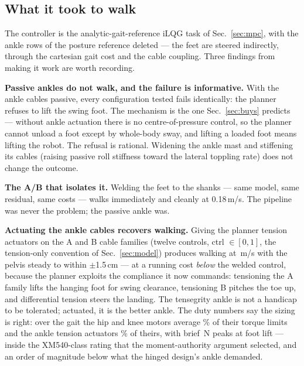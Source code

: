 \documentclass[conference]{IEEEtran}
\begin{document}
\subsection{What it took to walk}
The controller is the analytic-gait-reference iLQG task of
Sec.~\ref{sec:mpc}, with the ankle rows of the posture reference deleted ---
the feet are steered indirectly, through the cartesian gait cost and the
cable coupling. Three findings from making it work are worth recording.

\textbf{Passive ankles do not walk, and the failure is informative.} With the
ankle cables passive, every configuration tested fails identically: the
planner refuses to lift the swing foot. The mechanism is the one
Sec.~\ref{sec:buys} predicts --- without ankle actuation there is no
centre-of-pressure control, so the planner cannot unload a foot except by
whole-body sway, and lifting a loaded foot means lifting the robot. The
refusal is rational. Widening the ankle mast and stiffening its cables
(raising passive roll stiffness toward the lateral toppling rate) does not
change the outcome.

\textbf{The A/B that isolates it.} Welding the feet to the shanks --- same
model, same residual, same costs --- walks immediately and cleanly at
0.18\,m/s. The pipeline was never the problem; the passive ankle was.

\textbf{Actuating the ankle cables recovers walking.} Giving the planner
tension actuators on the A and B cable families (twelve controls, ctrl
$\in[0,1]$, the tension-only convention of Sec.~\ref{sec:model}) produces
walking at \hybridSpeed\,m/s with the pelvis steady to within $\pm$1.5\,cm
--- at a running cost \emph{below} the welded control, because the planner
exploits the compliance it now commands: tensioning the A family lifts the
hanging foot for swing clearance, tensioning B pitches the toe up, and
differential tension steers the landing. The tensegrity ankle is not a
handicap to be tolerated; actuated, it is the better ankle. The duty numbers
say the sizing is right: over the gait the hip and knee motors average
\hybridJointDuty\% of their torque limits and the ankle tension actuators
\hybridAnkleDuty\% of theirs, with brief \hybridAnklePeak\,N peaks at foot
lift --- inside the XM540-class rating that the moment-authority argument
selected, and an order of magnitude below what the hinged design's ankle
demanded.
\end{document}
